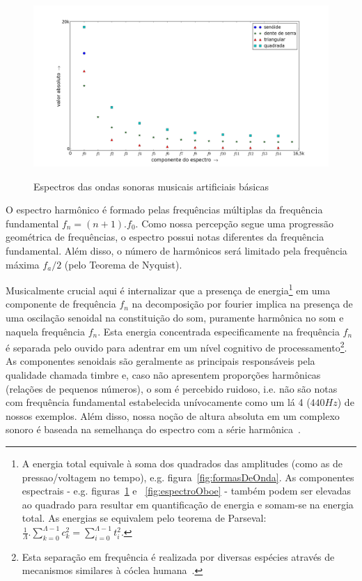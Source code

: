 \begin{figure}[h!]
    \centering
    \caption{Espectros das ondas sonoras musicais artificiais básicas}
        \includegraphics[width=\textwidth]{figuras/espectroDeOndas6}
        \label{fig:espectroDeOndas}
\end{figure}


O espectro harmônico é formado pelas frequências múltiplas da frequência fundamental $f_n=(n+1).f_0$.
Como nossa percepção segue uma progressão geométrica de frequências, o espectro possui notas diferentes da frequência fundamental. Além disso, o número de harmônicos será limitado pela frequência máxima $f_a/2$ (pelo Teorema de Nyquist). 

Musicalmente crucial aqui é internalizar que a presença de
energia\footnote{A energia total equivale à soma dos quadrados das amplitudes
(como as de pressao/voltagem no tempo), e.g. figura~\ref{fig:formasDeOnda}.
As componentes espectrais - e.g. figuras~\ref{fig:espectroDeOndas} e ~\ref{fig:espectroOboe} -
também podem ser elevadas ao quadrado para resultar em quantificação de energia e somam-se na energia total. As energias se equivalem pelo teorema de Parseval: $\frac{1}{\Lambda} . \sum_{k=0}^{\Lambda -1}c_k^2 = \sum_{i=0}^{\Lambda-1}t_i^2$.}
em uma componente de frequência $f_n$ na decomposição por fourier 
implica na presença de uma oscilação senoidal na constituição do som, puramente harmônica no som e naquela frequência $f_n$. Esta energia concentrada especificamente na frequência $f_n$ é separada
 pelo ouvido para adentrar em um nível cognitivo de processamento\footnote{Esta separação em frequência é realizada por diversas espécies através de mecanismos similares à cóclea humana~\cite{Roederer}.}.
  As componentes senoidais são geralmente as principais responsáveis pela qualidade chamada timbre e, caso não apresentem proporções harmônicas (relações de pequenos números), o som é percebido ruidoso, i.e. não são notas com frequência fundamental estabelecida unívocamente como um lá 4 ($440 Hz$) de nossos exemplos. Além disso, nossa noção de altura absoluta em um complexo sonoro é baseada na semelhança do espectro com a série harmônica~\cite{Roederer}.

